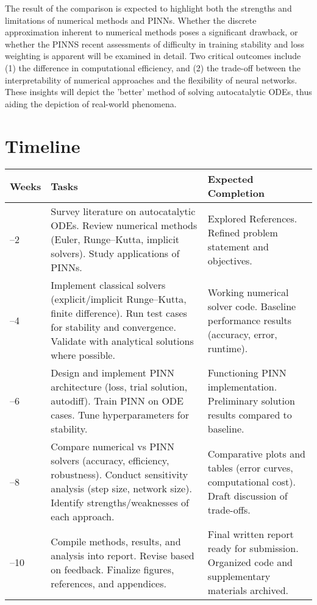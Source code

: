 \documentclass[11pt]{article}
\begin{document}
The result of the comparison is expected to highlight both the strengths and limitations of numerical methods and PINNs. Whether the discrete approximation inherent to numerical methods poses a significant drawback, or whether the PINNS recent assessments \cite{sophiya2025} of difficulty in training stability and loss weighting is apparent will be examined in detail. Two critical outcomes include (1) the difference in computational efficiency, and (2) the trade-off between the interpretability of numerical approaches and the flexibility of neural networks. These insights will depict the 'better' method of solving autocatalytic ODEs, thus aiding the depiction of real-world phenomena.

\section{Timeline}
\vspace{-0.2cm}

\begin{table}[h]
\centering
\small
\begin{tabular}{>{\centering\arraybackslash}p{1.2cm} p{5.5cm} p{5.5cm}}
\toprule
\textbf{Weeks} & \textbf{Tasks} & \textbf{Expected Completion} \\
\midrule
1–2 & Survey literature on autocatalytic ODEs. Review numerical methods (Euler, Runge–Kutta, implicit solvers). Study applications of PINNs. & Explored References. Refined problem statement and objectives. \\
\midrule
3–4 & Implement classical solvers (explicit/implicit Runge–Kutta, finite difference). Run test cases for stability and convergence. Validate with analytical solutions where possible. & Working numerical solver code. Baseline performance results (accuracy, error, runtime). \\
\midrule
5–6 & Design and implement PINN architecture (loss, trial solution, autodiff). Train PINN on ODE cases. Tune hyperparameters for stability. & Functioning PINN implementation. Preliminary solution results compared to baseline. \\
\midrule
7–8 & Compare numerical vs PINN solvers (accuracy, efficiency, robustness). Conduct sensitivity analysis (step size, network size). Identify strengths/weaknesses of each approach. & Comparative plots and tables (error curves, computational cost). Draft discussion of trade-offs. \\
\midrule
9–10 & Compile methods, results, and analysis into report. Revise based on feedback. Finalize figures, references, and appendices. & Final written report ready for submission. Organized code and supplementary materials archived. \\
\bottomrule
\end{tabular}
\end{table}
\end{document}
